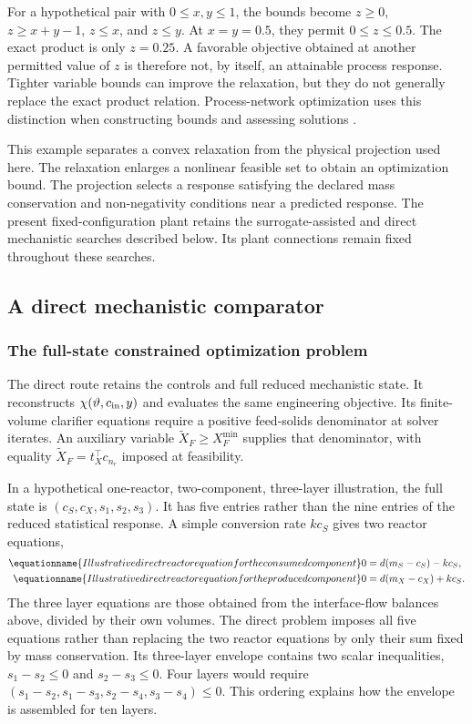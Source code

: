 For a hypothetical pair with $0\leq x,y\leq1$, the bounds become $z\geq0$, $z\geq x+y-1$, $z\leq x$, and $z\leq y$. At $x=y=0.5$, they permit $0\leq z\leq0.5$. The exact product is only $z=0.25$. A favorable objective obtained at another permitted value of $z$ is therefore not, by itself, an attainable process response. Tighter variable bounds can improve the relaxation, but they do not generally replace the exact product relation. Process-network optimization uses this distinction when constructing bounds and assessing solutions \citep{RubioCastro2013,YangNetwork2014}.

This example separates a convex relaxation from the physical projection used here. The relaxation enlarges a nonlinear feasible set to obtain an optimization bound. The projection selects a response satisfying the declared mass conservation and non-negativity conditions near a predicted response. The present fixed-configuration plant retains the surrogate-assisted and direct mechanistic searches described below. Its plant connections remain fixed throughout these searches.

\subsection{A direct mechanistic comparator}

\subsubsection{The full-state constrained optimization problem}

The direct route retains the controls and full reduced mechanistic state. It reconstructs $\chi(\vartheta,c_{\rm in},y)$ and evaluates the same engineering objective. Its finite-volume clarifier equations require a positive feed-solids denominator at solver iterates. An auxiliary variable $\widetilde X_F\ge X_F^{\min}$ supplies that denominator, with equality $\widetilde X_F=t_X^\top c_{n_r}$ imposed at feasibility.

In a hypothetical one-reactor, two-component, three-layer illustration, the full state is $(c_S,c_X,s_1,s_2,s_3)$. It has five entries rather than the nine entries of the reduced statistical response. A simple conversion rate $kc_S$ gives two reactor equations,
\begin{align}
\equationname{Illustrative direct reactor equation for the consumed component}
0&=d(m_S-c_S)-kc_S,\\
\equationname{Illustrative direct reactor equation for the produced component}
0&=d(m_X-c_X)+kc_S.
\end{align}
The three layer equations are those obtained from the interface-flow balances above, divided by their own volumes. The direct problem imposes all five equations rather than replacing the two reactor equations by only their sum fixed by mass conservation. Its three-layer envelope contains two scalar inequalities, $s_1-s_2\le0$ and $s_2-s_3\le0$. Four layers would require $(s_1-s_2,s_1-s_3,s_2-s_4,s_3-s_4)\le0$. This ordering explains how the envelope is assembled for ten layers.

